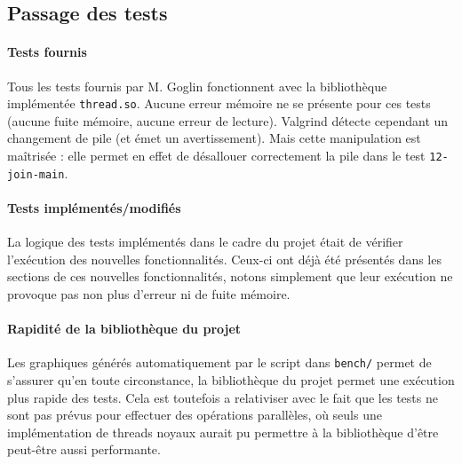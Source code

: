 \subsection{Passage des tests}

\paragraph{Tests fournis}
Tous les tests fournis par M. Goglin fonctionnent avec la bibliothèque implémentée \texttt{thread.so}. Aucune erreur mémoire ne se présente pour ces tests (aucune fuite mémoire, aucune erreur de lecture). \textsf{Valgrind} détecte cependant un changement de pile (et émet un avertissement). Mais cette manipulation est maîtrisée : elle permet en effet de désallouer correctement la pile dans le test \texttt{12-join-main}.

\paragraph{Tests implémentés/modifiés}
La logique des tests implémentés dans le cadre du projet était de vérifier l'exécution des nouvelles fonctionnalités. Ceux-ci ont déjà été présentés dans les sections de ces nouvelles fonctionnalités, notons simplement que leur exécution ne provoque pas non plus d'erreur ni de fuite mémoire.

\paragraph{Rapidité de la bibliothèque du projet}
Les graphiques générés automatiquement par le script dans \texttt{bench/} permet de s'assurer qu'en toute circonstance, la bibliothèque du projet permet une exécution plus rapide des tests. Cela est toutefois a relativiser avec le fait que les tests ne sont pas prévus pour effectuer des opérations parallèles, où seuls une implémentation de threads noyaux aurait pu permettre à la bibliothèque d'être peut-être aussi performante.